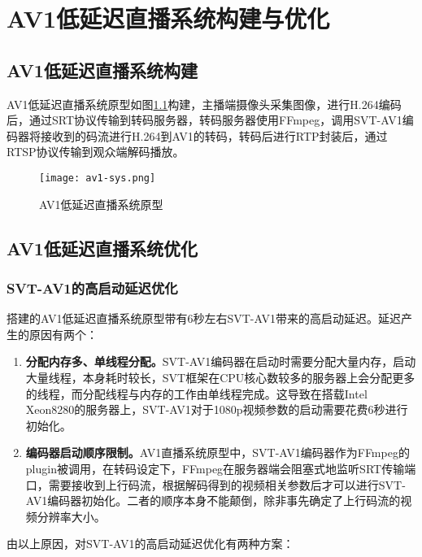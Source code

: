 \chapter{AV1低延迟直播系统构建与优化}

\section{AV1低延迟直播系统构建}

  AV1低延迟直播系统原型如图\ref{fig:av1-sys}构建，主播端摄像头采集图像，进行H.264编码后，通过SRT协议传输到转码服务器，转码服务器使用FFmpeg，调用SVT-AV1编码器将接收到的码流进行H.264到AV1的转码，转码后进行RTP封装后，通过RTSP协议传输到观众端解码播放。

  \begin{figure}[!htp]
    \centering
    \texttt{[image: av1-sys.png]}
    \caption{AV1低延迟直播系统原型}
   \label{fig:av1-sys}
  \end{figure}


\section{AV1低延迟直播系统优化}

\subsection{SVT-AV1的高启动延迟优化}
  搭建的AV1低延迟直播系统原型带有6秒左右SVT-AV1带来的高启动延迟。延迟产生的原因有两个：

  \begin{enumerate} [label=\arabic*)]
    \item \textbf{分配内存多、单线程分配。}SVT-AV1编码器在启动时需要分配大量内存，启动大量线程，本身耗时较长，SVT框架在CPU核心数较多的服务器上会分配更多的线程，而分配线程与内存的工作由单线程完成。这导致在搭载Intel Xeon8280的服务器上，SVT-AV1对于1080p视频参数的启动需要花费6秒进行初始化。
    \item \textbf{编码器启动顺序限制。}AV1直播系统原型中，SVT-AV1编码器作为FFmpeg的plugin被调用，在转码设定下，FFmpeg在服务器端会阻塞式地监听SRT传输端口，需要接收到上行码流，根据解码得到的视频相关参数后才可以进行SVT-AV1编码器初始化。二者的顺序本身不能颠倒，除非事先确定了上行码流的视频分辨率大小。
  \end{enumerate}

  由以上原因，对SVT-AV1的高启动延迟优化有两种方案：

